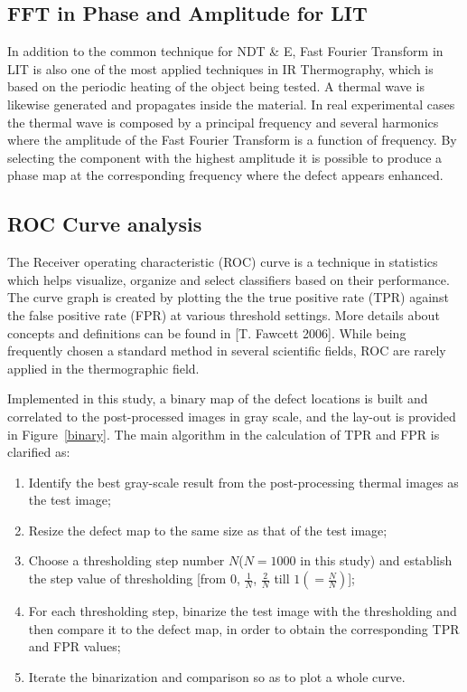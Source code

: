 \documentclass[]{spie}  %
\begin{document}
\subsection{FFT in Phase and Amplitude for LIT}
In addition to the common technique for NDT \& E, Fast Fourier Transform in LIT\cite{wu1998lock} is also one of the most applied techniques in IR Thermography, which is based on the periodic heating of the object being tested. A thermal wave is likewise generated and propagates inside the material. In real experimental cases the thermal wave is composed by a principal frequency and several harmonics where the amplitude of the Fast Fourier Transform is a function of frequency. By selecting the component with the highest amplitude it is possible to produce a phase map at the corresponding frequency where the defect appears enhanced.


\subsection{ROC Curve analysis} %
\label{sub:roc_curve_analysis}
The Receiver operating characteristic (ROC) curve is a technique in statistics which helps visualize, organize and select classifiers based on their performance. The curve graph is created by plotting the the true positive rate (TPR) against the false positive rate (FPR) at various threshold settings. More details about concepts and definitions can be found in [T. Fawcett 2006]\cite{Fawcett2006}. While being frequently chosen a standard method in several scientific fields, ROC are rarely applied in the thermographic field.\cite{Bison2014a} 

Implemented in this study, a binary map of the defect locations is built and correlated to the post-processed images in gray scale, and the lay-out is provided in Figure~\ref{binary}. The main algorithm in the calculation of TPR and FPR is clarified as:
\begin{enumerate}
   \item Identify the best gray-scale result from the post-processing thermal images as the test image;
   \item Resize the defect map to the same size as that of the test image;
   \item Choose a thresholding step number $N$($N=1000$ in this study) and establish the step value of thresholding [from $0$, $\frac{1}{N}$, $\frac{2}{N}$ till $1 (=\frac{N}{N})$];
   \item For each thresholding step, binarize the test image with the thresholding and then compare it to the defect map, in order to obtain the corresponding TPR and FPR values;
   \item Iterate the binarization and comparison so as to plot a whole curve.
\end{enumerate}
\end{document}
